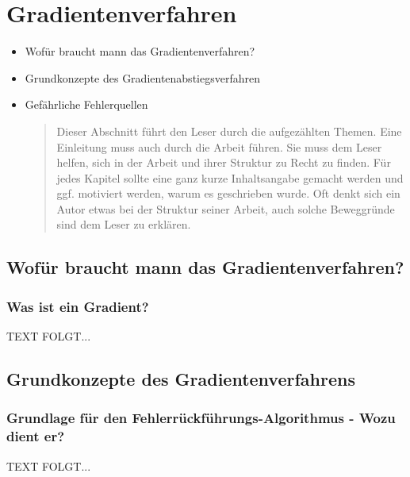 \newpage
\thispagestyle{empty}
\section{Gradientenverfahren}\label{sec:gradientenverfahren}   
\begin{tcolorbox}[title={Inhalte des \textit{Gradientenverfahren}}]
  \begin{itemize}
    \item Wofür braucht mann das Gradientenverfahren?
    \item Grundkonzepte des Gradientenabstiegsverfahren
    \item Gefährliche Fehlerquellen
  \begin{quotation}
      Dieser Abschnitt führt den Leser durch die aufgezählten Themen.
      Eine Einleitung muss auch durch die Arbeit führen. Sie muss dem Leser helfen, sich in der Arbeit und ihrer Struktur zu Recht zu finden.
      Für jedes Kapitel sollte eine ganz kurze Inhaltsangabe gemacht werden und ggf. motiviert werden, warum es geschrieben wurde. 
      Oft denkt sich ein Autor etwas bei der Struktur seiner Arbeit, auch solche Beweggründe sind dem Leser zu erklären. 
  \end{quotation}
  \end{itemize}
\end{tcolorbox}


\subsection{Wofür braucht mann das Gradientenverfahren?}\label{subsec:gradientenverfahren:wofuer}
\subsubsection{Was ist ein Gradient?}\label{subsec:gradientenverfahren:was_ist_gradient}
  TEXT FOLGT...


\subsection{Grundkonzepte des Gradientenverfahrens}\label{subsec:gradientenverfahren:grundkonzepte}
\subsubsection{Grundlage für den Fehlerrückführungs-Algorithmus - Wozu dient er?}\label{subsec:gradientenverfahren:grundlage_fehlerrueckfuehrungsalg}
  TEXT FOLGT...

